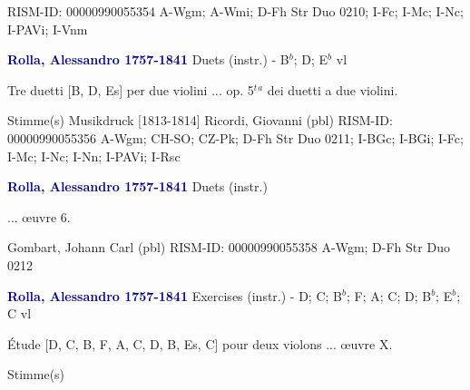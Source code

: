 \documentclass[twocolumn]{book}
\begin{document}
\newline RISM-ID: 00000990055354
\newline A-Wgm; A-Wmi; D-Fh  Str Duo 0210; I-Fc; I-Mc; I-Nc; I-PAVi; I-Vnm
\newline \par \vspace{7pt} \textcolor{darkblue}{\textbf{Rolla, Alessandro  1757-1841}}
\newline Duets (instr.) - B$^b$; D; E$^b$
 vl
\newline \begin{itshape}Tre duetti [B, D, Es] per due violini ... op. 5$^t$$^a$ dei duetti a due violini.\end{itshape} 
\newline \textcolor{darkblue}{}  Stimme(s)
\newline Musikdruck  [1813-1814]
\newline Ricordi, Giovanni  (pbl)
\newline RISM-ID: 00000990055356
\newline A-Wgm; CH-SO; CZ-Pk; D-Fh  Str Duo 0211; I-BGc; I-BGi; I-Fc; I-Mc; I-Nc; I-Nn; I-PAVi; I-Rsc
\newline \par \vspace{7pt} \textcolor{darkblue}{\textbf{Rolla, Alessandro  1757-1841}}
\newline Duets (instr.)
\newline \begin{itshape}... œuvre 6.\end{itshape} 
\newline Gombart, Johann Carl  (pbl)
\newline RISM-ID: 00000990055358
\newline A-Wgm; D-Fh  Str Duo 0212
\newline \par \vspace{7pt} \textcolor{darkblue}{\textbf{Rolla, Alessandro  1757-1841}}
\newline Exercises (instr.) - D; C; B$^b$; F; A; C; D; B$^b$; E$^b$; C
 vl
\newline \begin{itshape}Étude [D, C, B, F, A, C, D, B, Es, C] pour deux violons ... œuvre X.\end{itshape} 
\newline \textcolor{darkblue}{}  Stimme(s)
\end{document}
